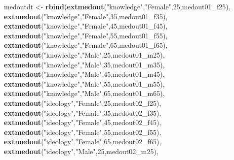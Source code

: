 \documentclass[
]{article}
\newenvironment{Shaded}{\begin{snugshade}}{\end{snugshade}}
\newcommand{\DecValTok}[1]{\textcolor[rgb]{0.00,0.00,0.81}{#1}}
\newcommand{\KeywordTok}[1]{\textcolor[rgb]{0.13,0.29,0.53}{\textbf{#1}}}
\newcommand{\NormalTok}[1]{#1}
\newcommand{\StringTok}[1]{\textcolor[rgb]{0.31,0.60,0.02}{#1}}
\begin{document}
\begin{Shaded}
\begin{Highlighting}[]
\NormalTok{medoutdt <-}\StringTok{ }\KeywordTok{rbind}\NormalTok{(}\KeywordTok{extmedout}\NormalTok{(}\StringTok{"knowledge"}\NormalTok{,}\StringTok{"Female"}\NormalTok{,}\DecValTok{25}\NormalTok{,medout01_f25),}
                  \KeywordTok{extmedout}\NormalTok{(}\StringTok{"knowledge"}\NormalTok{,}\StringTok{"Female"}\NormalTok{,}\DecValTok{35}\NormalTok{,medout01_f35),}
                  \KeywordTok{extmedout}\NormalTok{(}\StringTok{"knowledge"}\NormalTok{,}\StringTok{"Female"}\NormalTok{,}\DecValTok{45}\NormalTok{,medout01_f45),}
                  \KeywordTok{extmedout}\NormalTok{(}\StringTok{"knowledge"}\NormalTok{,}\StringTok{"Female"}\NormalTok{,}\DecValTok{55}\NormalTok{,medout01_f55),}
                  \KeywordTok{extmedout}\NormalTok{(}\StringTok{"knowledge"}\NormalTok{,}\StringTok{"Female"}\NormalTok{,}\DecValTok{65}\NormalTok{,medout01_f65),}
                  \KeywordTok{extmedout}\NormalTok{(}\StringTok{"knowledge"}\NormalTok{,}\StringTok{"Male"}\NormalTok{,}\DecValTok{25}\NormalTok{,medout01_m25),}
                  \KeywordTok{extmedout}\NormalTok{(}\StringTok{"knowledge"}\NormalTok{,}\StringTok{"Male"}\NormalTok{,}\DecValTok{35}\NormalTok{,medout01_m35),}
                  \KeywordTok{extmedout}\NormalTok{(}\StringTok{"knowledge"}\NormalTok{,}\StringTok{"Male"}\NormalTok{,}\DecValTok{45}\NormalTok{,medout01_m45),}
                  \KeywordTok{extmedout}\NormalTok{(}\StringTok{"knowledge"}\NormalTok{,}\StringTok{"Male"}\NormalTok{,}\DecValTok{55}\NormalTok{,medout01_m55),}
                  \KeywordTok{extmedout}\NormalTok{(}\StringTok{"knowledge"}\NormalTok{,}\StringTok{"Male"}\NormalTok{,}\DecValTok{65}\NormalTok{,medout01_m65),}
                  \KeywordTok{extmedout}\NormalTok{(}\StringTok{"ideology"}\NormalTok{,}\StringTok{"Female"}\NormalTok{,}\DecValTok{25}\NormalTok{,medout02_f25),}
                  \KeywordTok{extmedout}\NormalTok{(}\StringTok{"ideology"}\NormalTok{,}\StringTok{"Female"}\NormalTok{,}\DecValTok{35}\NormalTok{,medout02_f35),}
                  \KeywordTok{extmedout}\NormalTok{(}\StringTok{"ideology"}\NormalTok{,}\StringTok{"Female"}\NormalTok{,}\DecValTok{45}\NormalTok{,medout02_f45),}
                  \KeywordTok{extmedout}\NormalTok{(}\StringTok{"ideology"}\NormalTok{,}\StringTok{"Female"}\NormalTok{,}\DecValTok{55}\NormalTok{,medout02_f55),}
                  \KeywordTok{extmedout}\NormalTok{(}\StringTok{"ideology"}\NormalTok{,}\StringTok{"Female"}\NormalTok{,}\DecValTok{65}\NormalTok{,medout02_f65),}
                  \KeywordTok{extmedout}\NormalTok{(}\StringTok{"ideology"}\NormalTok{,}\StringTok{"Male"}\NormalTok{,}\DecValTok{25}\NormalTok{,medout02_m25),}

\end{Highlighting}
\end{Shaded}
\end{document}
